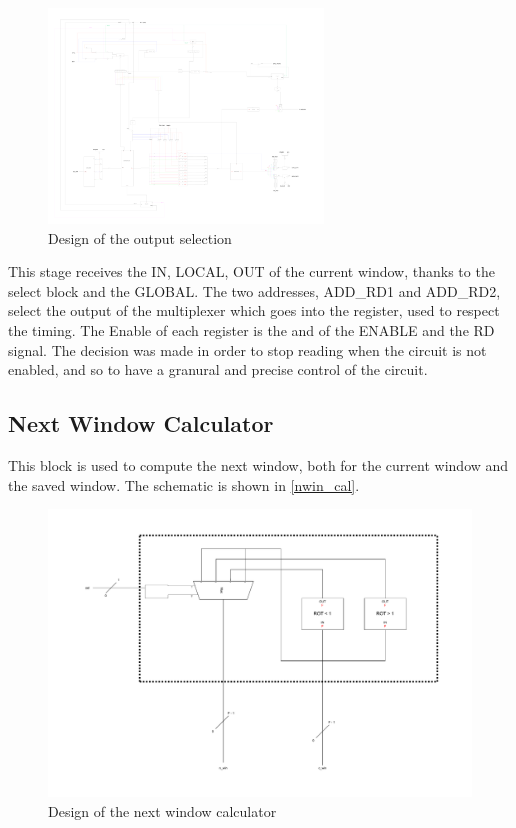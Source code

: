 \begin{figure}[H]
  \centering
  \includegraphics[width=0.65\textwidth]{chapters/4_DecodeStage/images/output_choice.pdf}
  \caption{Design of the output selection}
  \label{output_choice}
\end{figure}

This stage receives the IN, LOCAL, OUT of the current window, thanks to the select block and the GLOBAL. The two addresses, ADD\_RD1 and ADD\_RD2, select the output of the multiplexer which goes into the register, used to respect the timing. The Enable of each register is the and of the ENABLE and the RD signal. The decision was made in order to stop reading when the circuit is not enabled, and so to have a granural and precise control of the circuit.

\subsection{Next Window Calculator}

This block is used to compute the next window, both for the current window and the saved window. The schematic is shown in \autoref{nwin_cal}.

\begin{figure}[H]
  \centering
  \includegraphics[width=1\textwidth]{chapters/4_DecodeStage/images/nwin_cal.pdf}
  \caption{Design of the next window calculator}
  \label{nwin_cal}
\end{figure}

